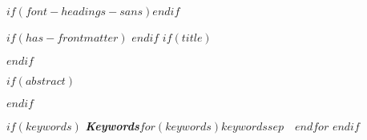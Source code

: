 $if(font-headings-sans)$\allsectionsfont{\sffamily}$endif$

$if(has-frontmatter)$
\frontmatter
$endif$
$if(title)$
\maketitle
$endif$

$if(abstract)$
\begin{abstract}
$abstract$
\end{abstract}
$endif$

$if(keywords)$
\textbf{\textit{Keywords}}\quad $for(keywords)$$keywords$$sep$~\textbullet~$endfor$
$endif$

